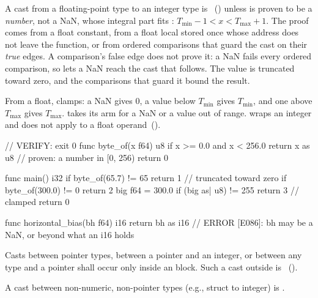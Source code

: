 \begin{constraint}
  A cast  from a floating-point type to an integer type  is
  \illformed{}~() unless  is proven to be a \emph{number}, not a NaN,
  whose integral part fits : \(T_{\min} - 1 < x < T_{\max} + 1\).  The proof comes from a
  float constant, from a float local stored once whose address does not leave the function, or
  from ordered comparisons that guard the cast on their \emph{true} edges.  A comparison's false
  edge does not prove it: a NaN fails every ordered comparison, so
   lets a NaN reach the cast that follows.  The
  value is truncated toward zero, and the comparisons that guard it bound the result.
\end{constraint}

\pnum
From a float,  clamps: a NaN gives 0, a value below \(T_{\min}\) gives \(T_{\min}\),
and one above \(T_{\max}\) gives \(T_{\max}\).   takes its  arm for
a NaN or a value out of range.   wraps an integer and does not apply to a float
operand~().

\begin{laincode}
// VERIFY: exit 0
func byte_of(x f64) u8 {
    if x >= 0.0 and x < 256.0 { return x as u8 }     // proven: a number in [0, 256)
    return 0
}

func main() i32 {
    if byte_of(65.7) != 65 { return 1 }               // truncated toward zero
    if byte_of(300.0) != 0 { return 2 }
    big f64 = 300.0
    if (big as| u8) != 255 { return 3 }               // clamped
    return 0
}
\end{laincode}

\begin{laincode}
func horizontal_bias(bh f64) i16 {
    return bh as i16       // ERROR [E086]: bh may be a NaN, or beyond what an i16 holds
}
\end{laincode}

\begin{constraint}
  Casts between pointer types, between a pointer and an integer, or between
  any type and a pointer shall occur only inside an  block.
  Such a cast outside  is \illformed{}~().
\end{constraint}

\begin{constraint}
  A cast between non-numeric, non-pointer types (e.g., struct to integer)
  is \illformed{}.
\end{constraint}

